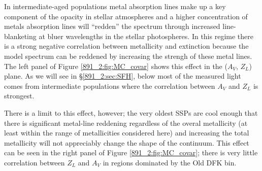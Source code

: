 
In intermediate-aged populations metal absorption lines make up a key
component of the opacity in stellar atmospheres and a higher
concentration of metals absorption lines will ``redden'' the spectrum
through increased line-blanketing at bluer wavelengths in the stellar
photospheres. In this regime there is a strong negative correlation
between metallicity and extinction because the model spectrum can be
reddened by increasing the strengh of these metal lines. The left
panel of Figure \ref{891_2:fig:MC_covar} shows this effect in the ($A_V$,
$Z_L$) plane. As we will see in \S\ref{891_2:sec:SFH}, below 
most of the measured light comes from intermediate populations where
the correlation between $A_V$ and $Z_L$ is strongest.

There is a limit to this effect, however; the very oldest SSPs are
cool enough that there is significant metal-line reddening regardless
of the overal metallicity (at least within the range of metallicities
considered here) and increasing the total metallicity will not
appreciably change the shape of the continuum. This effect can be seen
in the right panel of Figure \ref{891_2:fig:MC_covar}; there is very little
correlation between $Z_L$ and $A_V$ in regions dominated by the Old
DFK bin.


